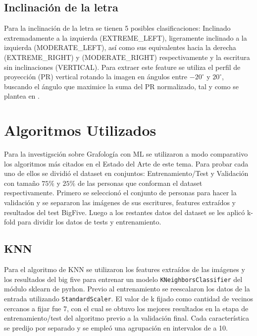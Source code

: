 \documentclass[10pt, a4paper]{article}
\begin{document}
        \subsection{Inclinaci\'on de la letra}
            Para la inclinaci\'on de la letra se tienen 5 posibles clasificaciones: Inclinado extremadamente a la izquierda (EXTREME\_LEFT), ligeramente inclinado a la 
            izquierda (MODERATE\_LEFT), as\'i como sus equivalentes hacia la derecha (EXTREME\_RIGHT) y (MODERATE\_RIGHT) respectivamente y la escritura sin inclinaciones (VERTICAL). 
            Para extraer este feature se utiliza el perfil de proyecci\'on (PR) vertical rotando la imagen en \'angulos entre $-20^{\circ}$ y $20^{\circ}$, buscando el \'angulo que maximice
            la suma del PR normalizado, tal y como se plantea en \cite{20}.

    \section{Algoritmos Utilizados}
        Para la investigsci\'on sobre Grafolog\'ia con ML se utilizaron a modo comparativo los algoritmos m\'as citados en el Estado del Arte de este tema. 
        Para probar cada uno de ellos se dividi\'o el dataset en  conjuntos: Entrenamiento/Test y Validaci\'on con tama\~no $75\%$ y $25\%$ de las personas que conforman el dataset respectivamente.
        Primero se seleccion\'o el conjunto de personas para hacer la validaci\'on y se separaron las im\'agenes de sus escritures, features extra\'idos y resultados del test BigFive. Luego a los restantes datos del dataset 
        se les aplic\'o k-fold para dividir los datos de tests y entrenamiento.  
        
        \subsection{KNN}
            Para el algoritmo de KNN se utilizaron los features extra\'idos de las im\'agenes y los resultados del big five para entrenar un modelo \texttt{KNeighborsClassifier} del m\'odulo sklearn de pyrhon. 
            Previo al entrenamiento se reescalaron los datos de la entrada utilizando \texttt{StandardScaler}. El valor de k fijado como cantidad de vecinos cercanos a fijar fue 7, con el cual se obtuvo los mejores resultados en 
            la etapa de entrenamiento/test del algoritmo previo a la validaci\'on final. Cada caracter\'istica se predijo por separado y se emple\'o una agrupaci\'on en intervalos de a 10.
        
\end{document}
